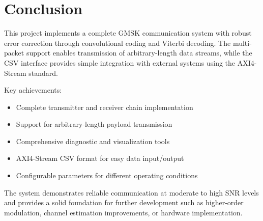 \documentclass[12pt]{article}
\begin{document}
\section{Conclusion}

This project implements a complete GMSK communication system with robust error correction through convolutional coding and Viterbi decoding. The multi-packet support enables transmission of arbitrary-length data streams, while the CSV interface provides simple integration with external systems using the AXI4-Stream standard.

Key achievements:
\begin{itemize}
    \item Complete transmitter and receiver chain implementation
    \item Support for arbitrary-length payload transmission
    \item Comprehensive diagnostic and visualization tools
    \item AXI4-Stream CSV format for easy data input/output
    \item Configurable parameters for different operating conditions
\end{itemize}

The system demonstrates reliable communication at moderate to high SNR levels and provides a solid foundation for further development such as higher-order modulation, channel estimation improvements, or hardware implementation.
\end{document}

